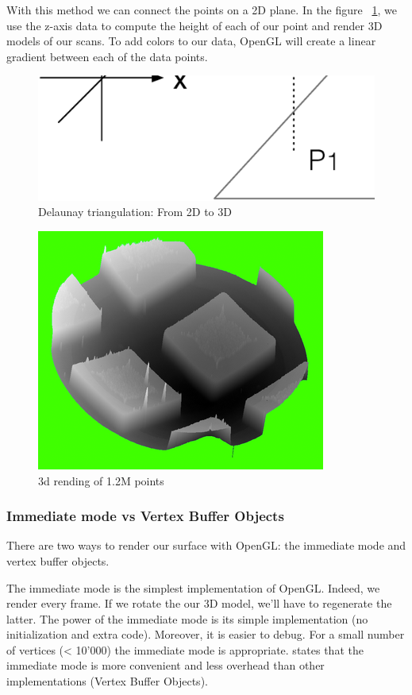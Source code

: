 With this method we can connect the points on a 2D plane. In the figure  ~\ref{triangulation3d}, we use the z-axis data to compute the height of each of our point and render 3D models of our scans. To add colors to our data, OpenGL will create a linear gradient between each of the data points.

\begin{figure}[!ht]
  \centering
  \includegraphics[scale=0.2]{images/delaunay.eps}
    \caption{Delaunay triangulation: From 2D to 3D}
  \label{triangulation3d}
\end{figure}

\begin{figure}[!ht]
  \centering
  \includegraphics[scale=0.8]{images/3drendering.png}
    \caption{3d rending of 1.2M points}
  \label{rendering3d}
\end{figure}

\subsubsection{Immediate mode vs Vertex Buffer Objects}

There are two ways to render our surface with OpenGL: the immediate mode and vertex buffer objects.

The immediate mode is the simplest implementation of OpenGL. Indeed, we render every frame. If we rotate the our 3D model, we'll have to regenerate the latter. The power of the immediate mode is its simple implementation (no initialization and extra code). Moreover, it is easier to debug. For a small number of vertices (< 10'000) the immediate mode is appropriate. \cite{opengl1} states that the immediate mode is more convenient and less overhead than other implementations (Vertex Buffer Objects).

